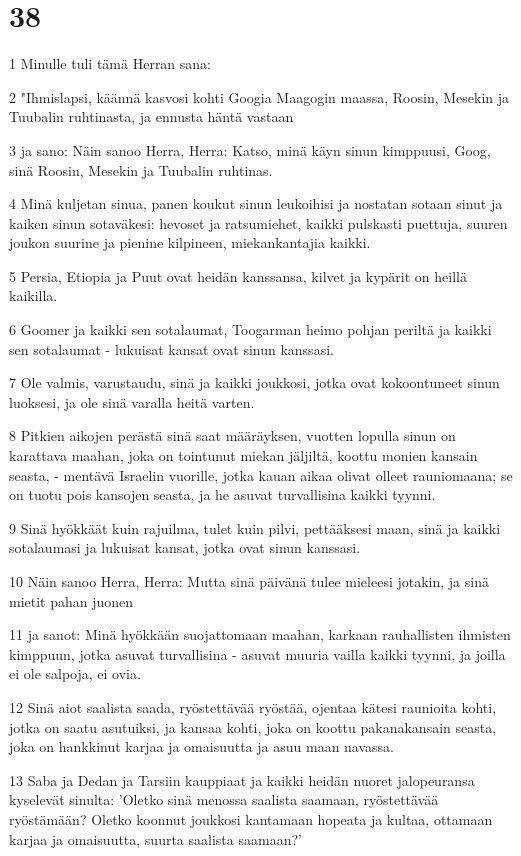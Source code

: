 \chapter{38}

\par 1 Minulle tuli tämä Herran sana:
\par 2 "Ihmislapsi, käännä kasvosi kohti Googia Maagogin maassa, Roosin, Mesekin ja Tuubalin ruhtinasta, ja ennusta häntä vastaan
\par 3 ja sano: Näin sanoo Herra, Herra: Katso, minä käyn sinun kimppuusi, Goog, sinä Roosin, Mesekin ja Tuubalin ruhtinas.
\par 4 Minä kuljetan sinua, panen koukut sinun leukoihisi ja nostatan sotaan sinut ja kaiken sinun sotaväkesi: hevoset ja ratsumiehet, kaikki pulskasti puettuja, suuren joukon suurine ja pienine kilpineen, miekankantajia kaikki.
\par 5 Persia, Etiopia ja Puut ovat heidän kanssansa, kilvet ja kypärit on heillä kaikilla.
\par 6 Goomer ja kaikki sen sotalaumat, Toogarman heimo pohjan periltä ja kaikki sen sotalaumat - lukuisat kansat ovat sinun kanssasi.
\par 7 Ole valmis, varustaudu, sinä ja kaikki joukkosi, jotka ovat kokoontuneet sinun luoksesi, ja ole sinä varalla heitä varten.
\par 8 Pitkien aikojen perästä sinä saat määräyksen, vuotten lopulla sinun on karattava maahan, joka on tointunut miekan jäljiltä, koottu monien kansain seasta, - mentävä Israelin vuorille, jotka kauan aikaa olivat olleet rauniomaana; se on tuotu pois kansojen seasta, ja he asuvat turvallisina kaikki tyynni.
\par 9 Sinä hyökkäät kuin rajuilma, tulet kuin pilvi, pettääksesi maan, sinä ja kaikki sotalaumasi ja lukuisat kansat, jotka ovat sinun kanssasi.
\par 10 Näin sanoo Herra, Herra: Mutta sinä päivänä tulee mieleesi jotakin, ja sinä mietit pahan juonen
\par 11 ja sanot: Minä hyökkään suojattomaan maahan, karkaan rauhallisten ihmisten kimppuun, jotka asuvat turvallisina - asuvat muuria vailla kaikki tyynni, ja joilla ei ole salpoja, ei ovia.
\par 12 Sinä aiot saalista saada, ryöstettävää ryöstää, ojentaa kätesi raunioita kohti, jotka on saatu asutuiksi, ja kansaa kohti, joka on koottu pakanakansain seasta, joka on hankkinut karjaa ja omaisuutta ja asuu maan navassa.
\par 13 Saba ja Dedan ja Tarsiin kauppiaat ja kaikki heidän nuoret jalopeuransa kyselevät sinulta: 'Oletko sinä menossa saalista saamaan, ryöstettävää ryöstämään? Oletko koonnut joukkosi kantamaan hopeata ja kultaa, ottamaan karjaa ja omaisuutta, suurta saalista saamaan?'
